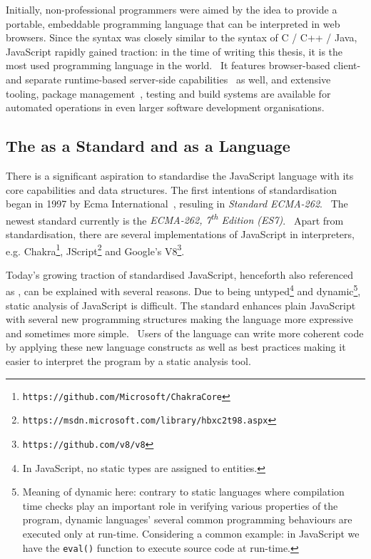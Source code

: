 Initially, non-professional programmers were aimed by the idea to provide a portable, embeddable programming language that can be interpreted in web browsers. Since the syntax was closely similar to the syntax of C / C++ / Java, JavaScript rapidly gained traction: in the time of writing this thesis, it is the most used programming language in the world.~\cite{javascriptstackoverflow} It features browser-based client- and separate runtime-based server-side capabilities~\cite{nodejs} as well, and extensive tooling, package management~\cite{npmjs}, testing and build systems are available for automated operations in even larger software development organisations.


\subsection{The \es as a Standard and as a Language}

There is a significant aspiration to standardise the JavaScript language with its core capabilities and data structures. The first intentions of standardisation began in 1997 by Ecma International~\cite{webedjavascripthistory}, resuling in \emph{Standard ECMA-262}.~\cite{ecmascriptstandardfirstversion} The newest standard currently is the \emph{ECMA-262, 7\textsuperscript{th} Edition (ES7)}.~\cite{ecmascriptstandard} Apart from standardisation, there are several implementations of JavaScript in interpreters, e.g. Chakra\footnote{\texttt{https://github.com/Microsoft/ChakraCore}}, JScript\footnote{\texttt{https://msdn.microsoft.com/library/hbxc2t98.aspx}} and Google's V8\footnote{\texttt{https://github.com/v8/v8}}.~\cite{stein-daniel-msc}

Today's growing traction of standardised JavaScript, henceforth also referenced as \es, can be explained with several reasons. Due to being untyped\footnote{In JavaScript, no static types are assigned to entities.} and dynamic\footnote{Meaning of dynamic here: contrary to static languages where compilation time checks play an important role in verifying various properties of the program, dynamic languages' several common programming behaviours are executed only at run-time. Considering a common example: in JavaScript we have the \texttt{eval()} function to execute source code at run-time.}, static analysis of JavaScript is difficult. The \es standard enhances plain JavaScript with several new programming structures making the language more expressive and sometimes more simple.~\cite{es6-features} Users of the language can write more coherent code by applying these new language constructs as well as best practices making it easier to interpret the program by a static analysis tool.


